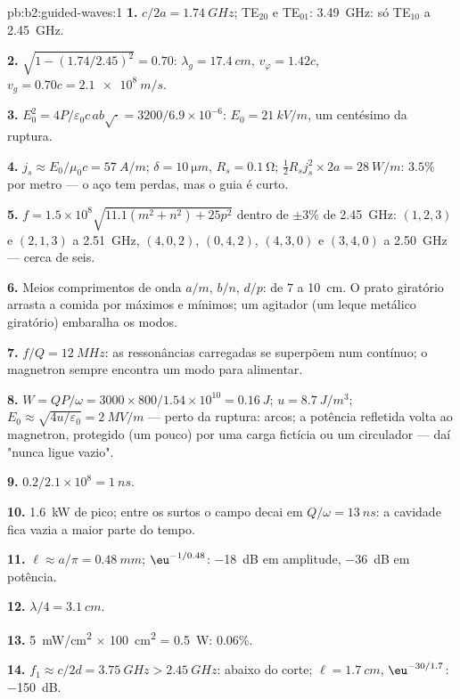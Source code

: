 \begin{solution}{pb:b2:guided-waves:1}
\textbf{1.} $c/2a = \qty{1.74}{GHz}$; TE$_{20}$ e TE$_{01}$: \qty{3.49}{GHz}: só
TE$_{10}$ a \qty{2.45}{GHz}.

\textbf{2.} $\sqrt{1 - (1.74/2.45)^2} = 0.70$: $\lambda_g = \qty{17.4}{cm}$, $v_\varphi = 1.42c$,
$v_g = 0.70c = \qty{2.1e8}{m/s}$.

\textbf{3.} $E_0^2 = 4P/\varepsilon_0c\,ab\sqrt{\cdot} = 3200/6.9 \times 10^{-6}$: $E_0 = \qty{21}{kV/m}$,
um centésimo da ruptura.

\textbf{4.} $j_s \approx E_0/\mu_0c = \qty{57}{A/m}$; $\delta = \qty{10}{\micro m}$, $R_s = \qty{0.1}{\ohm}$;
$\tfrac12R_sj_s^2 \times 2a = \qty{28}{W/m}$: $3.5\%$ por metro --- o aço tem perdas,
mas o guia é curto.

\textbf{5.} $f = 1.5 \times 10^8\sqrt{11.1(m^2 + n^2) + 25p^2}$ dentro de $\pm3\%$ de
\qty{2.45}{GHz}: $(1, 2, 3)$ e $(2, 1, 3)$ a \qty{2.51}{GHz}, $(4, 0, 2)$, $(0, 4, 2)$,
$(4, 3, 0)$ e $(3, 4, 0)$ a \qty{2.50}{GHz} --- cerca de seis.

\textbf{6.} Meios comprimentos de onda $a/m$, $b/n$, $d/p$: de $7$ a \qty{10}{cm}. O
prato giratório arrasta a comida por máximos e mínimos; um agitador (um
leque metálico giratório) embaralha os modos.

\textbf{7.} $f/Q = \qty{12}{MHz}$: as ressonâncias carregadas se superpõem num
contínuo; o magnetron sempre encontra um modo para alimentar.

\textbf{8.} $W = QP/\omega = 3000 \times 800/1.54 \times 10^{10} = \qty{0.16}{J}$; $u = \qty{8.7}{J/m^3}$;
$E_0 \approx \sqrt{4u/\varepsilon_0} = \qty{2}{MV/m}$ --- perto da ruptura: arcos; a potência
refletida volta ao magnetron, protegido (um pouco) por uma carga
fictícia ou um circulador --- daí "nunca ligue vazio".

\textbf{9.} $0.2/2.1 \times 10^8 = \qty{1}{ns}$.

\textbf{10.} \qty{1.6}{kW} de pico; entre os surtos o campo decai em
$Q/\omega = \qty{13}{ns}$: a cavidade fica vazia a maior parte do tempo.

\textbf{11.} $\ell \approx a/\pi = \qty{0.48}{mm}$; $\eu^{-1/0.48}$: \qty{-18}{dB} em amplitude,
\qty{-36}{dB} em potência.

\textbf{12.} $\lambda/4 = \qty{3.1}{cm}$.

\textbf{13.} \qty{5}{mW/cm^2} $\times$ \qty{100}{cm^2} = \qty{0.5}{W}: $0.06\%$.

\textbf{14.} $f_1 \approx c/2d = \qty{3.75}{GHz} > \qty{2.45}{GHz}$: abaixo do corte; $\ell =
\qty{1.7}{cm}$, $\eu^{-30/1.7}$: \qty{-150}{dB}.


\end{solution}
